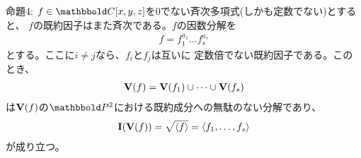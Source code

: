 \begin{framed}
  命題4:
  $f\in \C[x,y,z]$を0でない斉次多項式(しかも定数でない)とすると、
  $f$の既約因子はまた斉次である。$f$の因数分解を
  \begin{align}
    f= f_1^{a_1}\dots f_s^{a_s}
  \end{align}
  とする。ここに$i\neq j$なら、$f_i$と$f_j$は互いに
  定数倍でない既約因子である。このとき、
  \begin{align}
    \textbf V(f) = \textbf V(f_1) \cup \dots \cup \textbf V(f_s)
  \end{align}
  は$\textbf V(f)$の$\P^2$における既約成分への無駄のない分解であり、
  \begin{align}
    \textbf I(\textbf V(f))  = \sqrt{\left\langle f \right\rangle} = \left\langle f_1,\dots,f_s \right\rangle
  \end{align}
  が成り立つ。
\end{framed}
